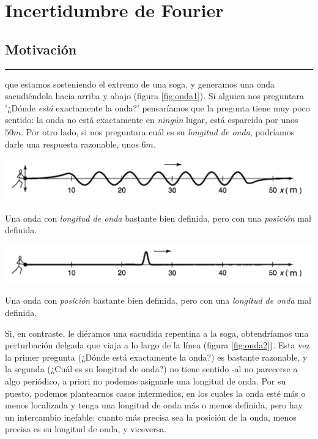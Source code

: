 \chapter{\textcolor{myred}{Incertidumbre de Fourier}}

\section{\huge{Motivación}}

\textcolor{myred}{\hrule}

 que estamos sosteniendo el extremo de una soga, y generamos una onda sacudiéndola hacia arriba y abajo (figura \ref{fig:onda1}). Si alguien nos preguntara '¿Dónde \textit{está} exactamente la onda?' pensaríamos que la pregunta tiene muy poco sentido: la onda no está exactamente en \textit{ningún} lugar, está esparcida por unos $50m$. Por otro lado, si nos preguntara cuál es su \textit{longitud de onda}, podríamos darle una respuesta razonable, unos $6m$.
\begin{marginfigure}
\captionsetup{type=figure}
    \centering
    \includegraphics[width=1.3\textwidth]{Im/onda1.png}
    \caption{Una onda con \textit{longitud de onda} bastante bien definida, pero con una \textit{posición} mal definida.}
    \label{fig:onda1}
\end{marginfigure}

\begin{marginfigure}
\captionsetup{type=figure}
    \centering
    \includegraphics[width=1.3\textwidth]{Im/onda2.png}
    \caption{Una onda con \textit{posición} bastante bien definida, pero con una \textit{longitud de onda} mal definida.}
    \label{fig:onda2}
\end{marginfigure}
Si, en contraste, le diéramos una sacudida repentina a la soga, obtendríamos una perturbación delgada que viaja a lo largo de la línea (figura \ref{fig:onda2}). Esta vez la primer pregunta (¿Dónde está exactamente la onda?) es bastante razonable, y la segunda (¿Cuál es su longitud de onda?) no tiene sentido -al no parecerse a algo periódico, a priori no podemos asignarle una longitud de onda. Por su puesto, podemos plantearnos casos intermedios, en los cuales la onda esté más o menos localizada y tenga una longitud de onda más o menos definida, pero hay un intercambio inefable: cuanto más precisa sea la posición de la onda, menos precisa es su longitud de onda, y viceversa\cite[][p.30]{GriffithsCuantica}.

